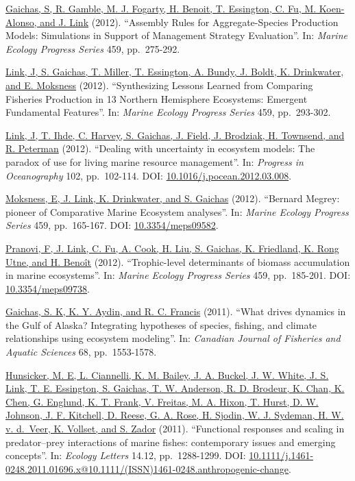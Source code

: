 \documentclass[11pt, a4paper]{awesome-cv}
\begin{document}
\protect\hyperlink{cite-gaichas_assembly_2012}{Gaichas, S, R. Gamble, M. J.
Fogarty, H. Benoit, T. Essington, C. Fu, M. Koen-Alonso, and J.
Link} (2012). ``Assembly Rules for
Aggregate-Species Production Models: Simulations in Support of
Management Strategy Evaluation''. In: \emph{Marine Ecology Progress Series}
459, pp.~275-292.

\protect\hyperlink{cite-link_synthesizing_2012}{Link, J, S. Gaichas, T. Miller,
T. Essington, A. Bundy, J. Boldt, K. Drinkwater, and E.
Moksness} (2012). ``Synthesizing Lessons
Learned from Comparing Fisheries Production in 13 Northern Hemisphere
Ecosystems: Emergent Fundamental Features''. In: \emph{Marine Ecology
Progress Series} 459, pp.~293-302.

\protect\hyperlink{cite-link_dealing_2012}{Link, J, T. Ihde, C. Harvey, S.
Gaichas, J. Field, J. Brodziak, H. Townsend, and R.
Peterman} (2012). ``Dealing with uncertainty in
ecosystem models: The paradox of use for living marine resource
management''. In: \emph{Progress in Oceanography} 102, pp.~102-114. DOI:
\href{https://doi.org/10.1016\%2Fj.pocean.2012.03.008}{10.1016/j.pocean.2012.03.008}.

\protect\hyperlink{cite-moksness_bernard_2012}{Moksness, E, J. Link, K.
Drinkwater, and S. Gaichas} (2012).
``Bernard Megrey: pioneer of Comparative Marine Ecosystem analyses''. In:
\emph{Marine Ecology Progress Series} 459, pp.~165-167. DOI:
\href{https://doi.org/10.3354\%2Fmeps09582}{10.3354/meps09582}.

\protect\hyperlink{cite-pranovi_trophic-level_2012}{Pranovi, F, J. Link, C. Fu,
A. Cook, H. Liu, S. Gaichas, K. Friedland, K. Rong Utne, and H.
Benoît} (2012). ``Trophic-level
determinants of biomass accumulation in marine ecosystems''. In: \emph{Marine
Ecology Progress Series} 459, pp.~185-201. DOI:
\href{https://doi.org/10.3354\%2Fmeps09738}{10.3354/meps09738}.

\protect\hyperlink{cite-gaichas_what_2011}{Gaichas, S. K, K. Y. Aydin, and R.
C. Francis} (2011). ``What drives dynamics in
the Gulf of Alaska? Integrating hypotheses of species, fishing, and
climate relationships using ecosystem modeling''. In: \emph{Canadian Journal
of Fisheries and Aquatic Sciences} 68, pp.~1553-1578.

\protect\hyperlink{cite-hunsicker_functional_2011}{Hunsicker, M. E, L.
Ciannelli, K. M. Bailey, J. A. Buckel, J. W. White, J. S. Link, T. E.
Essington, S. Gaichas, T. W. Anderson, R. D. Brodeur, K. Chan, K. Chen,
G. Englund, K. T. Frank, V. Freitas, M. A. Hixon, T. Hurst, D. W.
Johnson, J. F. Kitchell, D. Reese, G. A. Rose, H. Sjodin, W. J.
Sydeman, H. W. v. d.~Veer, K. Vollset, and S.
Zador} (2011). ``Functional responses
and scaling in predator--prey interactions of marine fishes:
contemporary issues and emerging concepts''. In: \emph{Ecology Letters}
14.12, pp.~1288-1299. DOI:
\href{https://doi.org/10.1111\%2Fj.1461-0248.2011.01696.x\%4010.1111\%2F\%28ISSN\%291461-0248.anthropogenic-change}{10.1111/j.1461-0248.2011.01696.x@10.1111/(ISSN)1461-0248.anthropogenic-change}.
\end{document}
